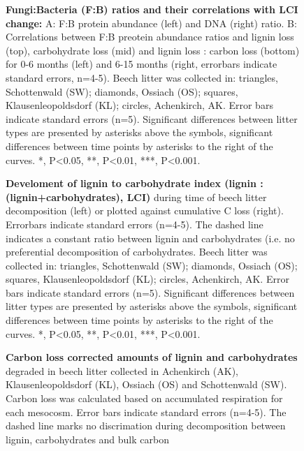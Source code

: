 \documentclass[10pt]{article}
\begin{document}
\begin{flushleft}
\begin{figure}[!h]
\begin{center}
\end{center}
\caption{
{\bf Fungi:Bacteria (F:B) ratios and their correlations with LCI change:} A: F:B protein abundance (left) and DNA (right) ratio. B: Correlations between F:B preotein abundance ratios and lignin loss (top), carbohydrate loss (mid) and lignin loss : carbon loss (bottom) for 0-6 months (left) and 6-15 months (right, errorbars indicate standard errors, n=4-5).  Beech litter was collected in: triangles, Schottenwald (SW); diamonds, Ossiach (OS); squares, Klausenleopoldsdorf (KL); circles, Achenkirch, AK. Error bars indicate standard errors (n=5). Significant differences between litter types are presented by asterisks above the symbols, significant differences between time points by asterisks to the right of the curves. *, P\textless 0.05, **, P\textless 0.01, ***, P\textless 0.001.}
\label{fig:f2b}
\end{figure}

\begin{figure}[!h]
\begin{center}
\end{center}
\caption{
{\bf Develoment of lignin to carbohydrate index (lignin : (lignin+carbohydrates), LCI)} during time of beech litter decomposition (left) or plotted against cumulative C loss (right). Errorbars indicate standard errors (n=4-5). The dashed line indicates a constant ratio between lignin and carbohydrates (i.e. no preferential decomposition of carbohydrates. Beech litter was collected in: triangles, Schottenwald (SW); diamonds, Ossiach (OS); squares, Klausenleopoldsdorf (KL); circles, Achenkirch, AK. Error bars indicate standard errors (n=5). Significant differences between litter types are presented by asterisks above the symbols, significant differences between time points by asterisks to the right of the curves. *, P\textless 0.05, **, P\textless 0.01, ***, P\textless 0.001.}
\label{fig:lci}
\end{figure}

\begin{figure}[h!]
\vspace*{2mm}
\begin{center}
\end{center}
\caption{
{\bf Carbon loss corrected amounts of lignin and carbohydrates} degraded in beech litter collected in Achenkirch (AK), Klausenleopoldsdorf (KL), Ossiach (OS) and Schottenwald (SW). Carbon loss was calculated based on accumulated respiration for each mesocosm. Error bars indicate standard errors (n=4-5). The dashed line marks no discrimation during decomposition between lignin, carbohydrates and bulk carbon}
\label{fig:degr}
\end{figure}


\end{flushleft}
\end{document}
